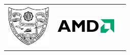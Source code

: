 \documentclass[a4paper,12pt]{report}
\begin{document}
\begin{titlepage}
\begin{center}
\begin{table}[H]
\begin{tabular}{ccc}
        \hspace{.5cm}  \begin{minipage}{.5\textwidth}
      \includegraphics[width=0.85in, height=0.85in]{./figures/Surthkal_logo.eps}
    \end{minipage}
    &
    \begin{minipage}{.5\textwidth}
		\includegraphics[width=1.2in, height=0.6in]{./figures/amd_logo.eps}
     \end{minipage}
      \end{tabular}
 \end{table}

%
\vspace{-0.25in}


\end{center}
\end{titlepage}
\end{document}
